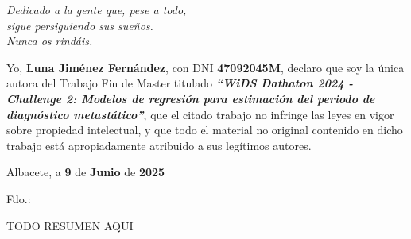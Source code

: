 %
% 



\cleardoublepage
\thispagestyle{empty}

\vspace*{9cm}  
\begin{flushright} \em 
Dedicado a la gente que, pese a todo,\\
sigue persiguiendo sus sueños.\\
Nunca os rindáis.
\end{flushright}


\cleardoublepage
\thispagestyle{plain}
\setcounter{page}{1} \null
\begin{center}
\Large{}
\end{center}
\vskip1cm

Yo, \textbf{Luna Jiménez Fernández}, con DNI \textbf{47092045M}, declaro que soy la única autora del Trabajo Fin de Master titulado \textbf{\textit{``WiDS Dathaton 2024 - Challenge 2: Modelos de regresión para estimación del periodo de diagnóstico metastático''}}, que el citado trabajo no infringe las leyes en vigor sobre propiedad intelectual, y que todo el material no original contenido en dicho trabajo está apropiadamente atribuido a sus legítimos autores.

\vspace*{2cm}
\begin{center}
Albacete, a \textbf{9} de \textbf{Junio} de \textbf{2025}

\vskip3cm

Fdo.: \textbf{\autor}
\end{center}


\cleardoublepage
\thispagestyle{plain}
\begin{center}
\Large{}
\end{center}
\vskip1cm

TODO RESUMEN AQUI

\cleardoublepage
\thispagestyle{plain}
\begin{center}
	\Large{}
\end{center}
\vskip1cm

